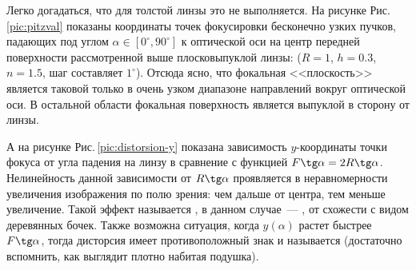 Легко догадаться, что для толстой линзы это не выполняется. На рисунке Рис.\,\ref{pic:pitzval} показаны координаты точек фокусировки бесконечно узких пучков, падающих под углом $\alpha \in [0^\circ, 90^\circ]$ к оптической оси на центр передней поверхности рассмотренной выше плосковыпуклой линзы: ($R = 1$, $h = 0.3$, $n=1.5$, шаг составляет $1^\circ$). Отсюда ясно, что фокальная <<плоскость>> является таковой только в очень узком диапазоне направлений вокруг оптической оси. В остальной области фокальная поверхность является выпуклой в сторону от линзы.

А на рисунке Рис.\,\ref{pic:distorsion-y} показана зависимость $y$-координаты точки фокуса от угла падения на линзу в сравнение с функцией $F \tg \alpha = 2R \tg \alpha$. Нелинейность данной зависимости от $R \tg \alpha$ проявляется в неравномерности увеличения изображения по полю зрения: чем дальше от центра, тем меньше увеличение. Такой эффект называется , в данном случае~--- , от схожести с видом деревянных бочек. Также возможна ситуация, когда $y(\alpha)$ растет быстрее $F \tg \alpha$, тогда дисторсия имеет противоположный знак и называется  (достаточно вспомнить, как выглядит плотно набитая подушка).

